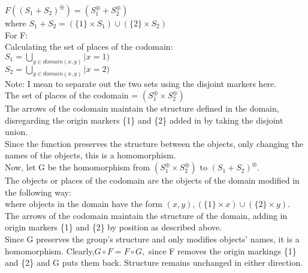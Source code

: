 $F((S_1 + S_2)^\oplus) = (S_1 ^\oplus + S_2 ^\oplus)$\\
where $S_1 + S_2 = (\{1\} \times S_1) \cup (\{2\} \times S_2)$\\
For F:\\
Calculating the set of places of the codomain:\\
  $S_1 =  \bigcup_{ y \in domain (x, y)} | x=1)$\\
  $S_2 =  \bigcup_{y \in domain (x, y)} | x=2)$\\
Note: I mean to separate out the two sets using the disjoint markers here.\\
The set of places of the codomain = $(S_1 ^\oplus \times S_2 ^\oplus)$\\
The arrows of the codomain maintain the structure defined in the domain, disregarding the origin markers \{1\} and \{2\} added in by taking the disjoint union.\\
Since the function preserves the structure between the objects, only changing the names of the objects, this is a homomorphism.\\
Now, let G be the homomorphism from $(S_1 ^\oplus \times S_2 ^\oplus)$ to $(S_1 + S_2)^\oplus$. \\
The objects or places of the codomain are the objects of the domain modified in the following way:\\
where objects in the domain have the form $(x, y), (\{1\} \times x) \cup (\{2\} \times y).$\\
The arrows of the codomain maintain the structure of the domain, adding in origin markers \{1\} and \{2\} by position as described above.\\
Since G preserves the group's structure and only modifies objects' names, it is a homomorphism. 
Clearly,$ G \circ F = F \circ G,$ since F removes the origin markings  \{1\} and \{2\} and G puts them back. Structure remains unchanged in either direction.\\
\newpage


